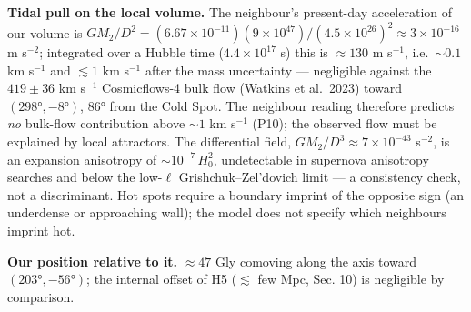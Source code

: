 \documentclass[
]{article}
\begin{document}
\textbf{Tidal pull on the local volume.} The neighbour's present-day
acceleration of our volume is
\(GM_2/D^2 = (6.67\times10^{-11})(9\times10^{47})/(4.5\times10^{26})^2 \approx 3\times10^{-16}\)
m s\(^{-2}\); integrated over a Hubble time (\(4.4\times10^{17}\) s)
this is \(\approx 130\) m s\(^{-1}\), i.e.~\(\sim\!0.1\) km s\(^{-1}\)
and \(\lesssim 1\) km s\(^{-1}\) after the mass uncertainty ---
negligible against the \(419 \pm 36\) km s\(^{-1}\) Cosmicflows-4 bulk
flow (Watkins et al.~2023) toward \((298°, -8°)\), \(86°\) from the Cold
Spot. The neighbour reading therefore predicts \emph{no} bulk-flow
contribution above \(\sim\!1\) km s\(^{-1}\) (P10); the observed flow
must be explained by local attractors. The differential field,
\(GM_2/D^3 \approx 7\times10^{-43}\) s\(^{-2}\), is an expansion
anisotropy of \(\sim\!10^{-7}\,H_0^2\), undetectable in supernova
anisotropy searches and below the low-\(\ell\) Grishchuk--Zel'dovich
limit --- a consistency check, not a discriminant. Hot spots require a
boundary imprint of the opposite sign (an underdense or approaching
wall); the model does not specify which neighbours imprint hot.

\textbf{Our position relative to it.} \(\approx 47\) Gly comoving along
the axis toward \((203°, -56°)\); the internal offset of H5
(\(\lesssim\) few Mpc, Sec. 10) is negligible by comparison.
\end{document}
